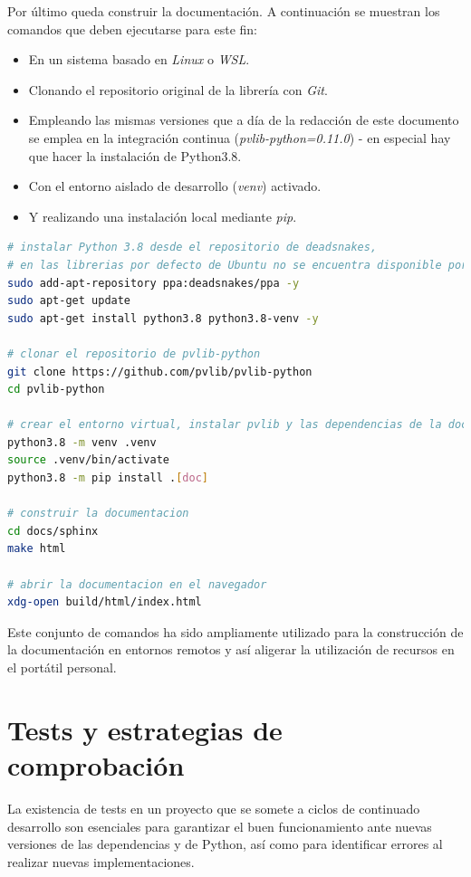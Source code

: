 Por último queda construir la documentación. A continuación se muestran los comandos que deben ejecutarse para este fin:

\begin{itemize}
    \item En un sistema basado en \textit{Linux} o \textit{WSL}.
    \item Clonando el repositorio original de la librería con \textit{Git}.
    \item Empleando las mismas versiones que a día de la redacción de este documento se emplea en la integración continua (\textit{pvlib-python=0.11.0}) - en especial hay que hacer la instalación de Python3.8.
    \item Con el entorno aislado de desarrollo (\textit{venv}) activado.
    \item Y realizando una instalación local mediante \textit{pip}.
\end{itemize}

\begin{lstlisting}[language=bash, caption={Comandos para construir la documentación de \pvlibpy.}, label={lst:doc_build}]
# instalar Python 3.8 desde el repositorio de deadsnakes,
# en las librerias por defecto de Ubuntu no se encuentra disponible por antiguedad
sudo add-apt-repository ppa:deadsnakes/ppa -y
sudo apt-get update
sudo apt-get install python3.8 python3.8-venv -y

# clonar el repositorio de pvlib-python
git clone https://github.com/pvlib/pvlib-python
cd pvlib-python

# crear el entorno virtual, instalar pvlib y las dependencias de la documentacion
python3.8 -m venv .venv
source .venv/bin/activate
python3.8 -m pip install .[doc]

# construir la documentacion
cd docs/sphinx
make html

# abrir la documentacion en el navegador
xdg-open build/html/index.html
\end{lstlisting}

Este conjunto de comandos ha sido ampliamente utilizado para la construcción de la documentación en entornos remotos y así aligerar la utilización de recursos en el portátil personal.

\section{Tests y estrategias de comprobación}

La existencia de tests en un proyecto que se somete a ciclos de continuado desarrollo son esenciales para garantizar el buen funcionamiento ante nuevas versiones de las dependencias y de Python, así como para identificar errores al realizar nuevas implementaciones.


